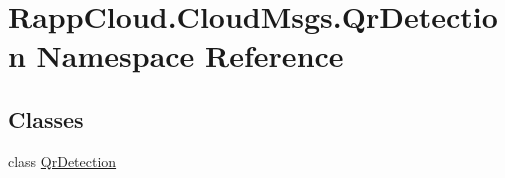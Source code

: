 \hypertarget{namespaceRappCloud_1_1CloudMsgs_1_1QrDetection}{\section{Rapp\-Cloud.\-Cloud\-Msgs.\-Qr\-Detection Namespace Reference}
\label{namespaceRappCloud_1_1CloudMsgs_1_1QrDetection}
}
\subsection*{Classes}
\begin{DoxyCompactItemize}
\item 
class \hyperlink{classRappCloud_1_1CloudMsgs_1_1QrDetection_1_1QrDetection}{Qr\-Detection}
\end{DoxyCompactItemize}
